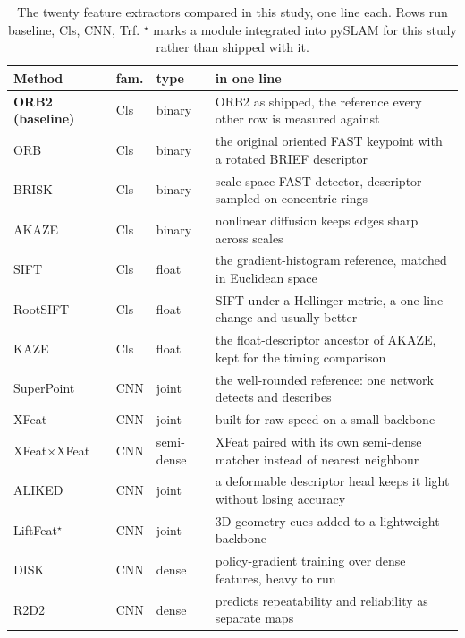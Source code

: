 \begin{table}[H]
\centering
\caption{The twenty feature extractors compared in this study, one line each. Rows run baseline, Cls, CNN, Trf. $^\star$ marks a module integrated into pySLAM for this study rather than shipped with it.}
\label{tab:fe-glance}
\footnotesize
\setlength{\tabcolsep}{4pt}
\begin{tabular}{@{}llp{1.9cm}p{6.5cm}@{}}
\toprule
\textbf{Method} & \textbf{fam.} & \textbf{type} & \textbf{in one line} \\
\midrule
\textbf{ORB2 (baseline)} \cite{murartal2017orbslam2} & Cls & binary & ORB2 as shipped, the reference every other row is measured against \\
ORB \cite{rublee2011orb} & Cls & binary & the original oriented FAST keypoint with a rotated BRIEF descriptor \\
BRISK \cite{leutenegger2011brisk} & Cls & binary & scale-space FAST detector, descriptor sampled on concentric rings \\
AKAZE \cite{alcantarilla2013akaze} & Cls & binary & nonlinear diffusion keeps edges sharp across scales \\
SIFT \cite{lowe2004sift} & Cls & float & the gradient-histogram reference, matched in Euclidean space \\
RootSIFT \cite{arandjelovic2012rootsift} & Cls & float & SIFT under a Hellinger metric, a one-line change and usually better \\
KAZE \cite{alcantarilla2012kaze} & Cls & float & the float-descriptor ancestor of AKAZE, kept for the timing comparison \\
\addlinespace[2pt]
SuperPoint \cite{detone2018superpoint} & CNN & joint & the well-rounded reference: one network detects and describes \\
XFeat \cite{potje2024xfeat} & CNN & joint & built for raw speed on a small backbone \\
XFeat×XFeat \cite{potje2024xfeat} & CNN & semi-dense & XFeat paired with its own semi-dense matcher instead of nearest neighbour \\
ALIKED \cite{zhao2023aliked} & CNN & joint & a deformable descriptor head keeps it light without losing accuracy \\
LiftFeat$^\star$ \cite{liu2025liftfeat} & CNN & joint & 3D-geometry cues added to a lightweight backbone \\
DISK \cite{tyszkiewicz2020disk} & CNN & dense & policy-gradient training over dense features, heavy to run \\
R2D2 \cite{revaud2019r2d2} & CNN & dense & predicts repeatability and reliability as separate maps \\

\end{tabular}
\end{table}
